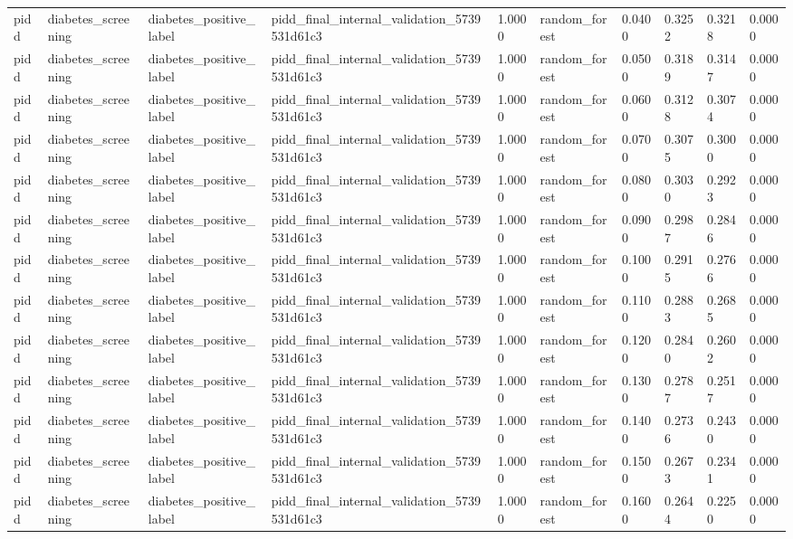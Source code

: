 \begin{tabular}{llllllllll}
pidd & diabetes\_screening & diabetes\_positive\_label & pidd\_final\_internal\_validation\_5739531d61c3 & 1.0000 & random\_forest & 0.0400 & 0.3252 & 0.3218 & 0.0000 \\
pidd & diabetes\_screening & diabetes\_positive\_label & pidd\_final\_internal\_validation\_5739531d61c3 & 1.0000 & random\_forest & 0.0500 & 0.3189 & 0.3147 & 0.0000 \\
pidd & diabetes\_screening & diabetes\_positive\_label & pidd\_final\_internal\_validation\_5739531d61c3 & 1.0000 & random\_forest & 0.0600 & 0.3128 & 0.3074 & 0.0000 \\
pidd & diabetes\_screening & diabetes\_positive\_label & pidd\_final\_internal\_validation\_5739531d61c3 & 1.0000 & random\_forest & 0.0700 & 0.3075 & 0.3000 & 0.0000 \\
pidd & diabetes\_screening & diabetes\_positive\_label & pidd\_final\_internal\_validation\_5739531d61c3 & 1.0000 & random\_forest & 0.0800 & 0.3030 & 0.2923 & 0.0000 \\
pidd & diabetes\_screening & diabetes\_positive\_label & pidd\_final\_internal\_validation\_5739531d61c3 & 1.0000 & random\_forest & 0.0900 & 0.2987 & 0.2846 & 0.0000 \\
pidd & diabetes\_screening & diabetes\_positive\_label & pidd\_final\_internal\_validation\_5739531d61c3 & 1.0000 & random\_forest & 0.1000 & 0.2915 & 0.2766 & 0.0000 \\
pidd & diabetes\_screening & diabetes\_positive\_label & pidd\_final\_internal\_validation\_5739531d61c3 & 1.0000 & random\_forest & 0.1100 & 0.2883 & 0.2685 & 0.0000 \\
pidd & diabetes\_screening & diabetes\_positive\_label & pidd\_final\_internal\_validation\_5739531d61c3 & 1.0000 & random\_forest & 0.1200 & 0.2840 & 0.2602 & 0.0000 \\
pidd & diabetes\_screening & diabetes\_positive\_label & pidd\_final\_internal\_validation\_5739531d61c3 & 1.0000 & random\_forest & 0.1300 & 0.2787 & 0.2517 & 0.0000 \\
pidd & diabetes\_screening & diabetes\_positive\_label & pidd\_final\_internal\_validation\_5739531d61c3 & 1.0000 & random\_forest & 0.1400 & 0.2736 & 0.2430 & 0.0000 \\
pidd & diabetes\_screening & diabetes\_positive\_label & pidd\_final\_internal\_validation\_5739531d61c3 & 1.0000 & random\_forest & 0.1500 & 0.2673 & 0.2341 & 0.0000 \\
pidd & diabetes\_screening & diabetes\_positive\_label & pidd\_final\_internal\_validation\_5739531d61c3 & 1.0000 & random\_forest & 0.1600 & 0.2644 & 0.2250 & 0.0000 \\

\end{tabular}
